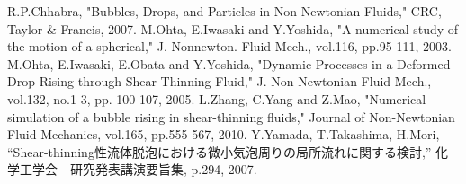 \begin{thebibliography}{99}
     R.P.Chhabra, "Bubbles, Drops, and Particles in Non-Newtonian Fluids," CRC, Taylor \& Francis, 2007.
     M.Ohta, E.Iwasaki and Y.Yoshida, "A numerical study of the motion of a spherical," J. Nonnewton. Fluid Mech., vol.116, pp.95-111, 2003.
     M.Ohta, E.Iwasaki, E.Obata and Y.Yoshida, "Dynamic Processes in a Deformed Drop Rising through Shear-Thinning Fluid," J. Non-Newtonian Fluid Mech., vol.132, no.1-3, pp. 100-107, 2005.
     L.Zhang, C.Yang and Z.Mao, "Numerical simulation of a bubble rising in shear-thinning fluids," Journal of Non-Newtonian Fluid Mechanics, vol.165, pp.555-567, 2010.
     Y.Yamada, T.Takashima, H.Mori, “Shear-thinning性流体脱泡における微小気泡周りの局所流れに関する検討,” 化学工学会　研究発表講演要旨集, p.294, 2007.
\end{thebibliography}